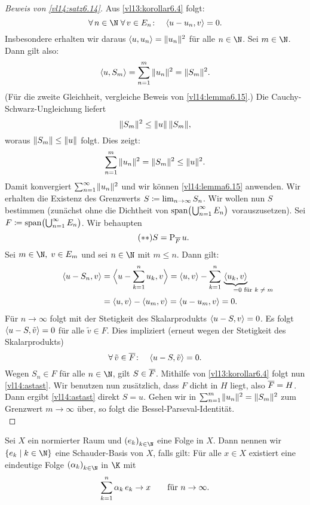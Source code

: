 \begin{proof}[Beweis von \cref{vl14:satz6.14}]
    Aus \cref{vl13:korollar6.4} folgt:
    \[ \forall\,n\in\N\;\forall\, v\in E_n\colon\quad
        \SP{u-u_n, v} = 0
    . \]
    Insbesondere erhalten wir daraus $\SP{u,u_n} = \norm{u_n}^2$ für alle
    $n\in\N$. Sei $m\in\N$. Dann gilt also:
    \[ \SP{u, S_m} = \nsum^m \, \norm{u_n}^2 = \norm{S_m}^2  . \]
    (Für die zweite Gleichheit, vergleiche Beweis von
    \cref{vl14:lemma6.15}.)
    Die Cauchy-Schwarz-Ungleichung  liefert
    \[ \norm{S_m}^2  \leq \norm{u} \, \norm{S_m}  , \]
    woraus $\norm{S_m} \leq \norm{u}$ folgt. Dies zeigt:
    \[ \nsum^m \, \norm{u_n}^2 = \norm{S_m}^2 \leq \norm{u}^2  . \]
    Damit konvergiert $\nsum^\infty \mkern1mu \norm{u_n}^2$ und wir können
    \cref{vl14:lemma6.15} anwenden. Wir erhalten die Existenz des Grenzwerts
    $S \defeq \lim_{n\to\infty} S_n$. Wir wollen nun $S$ bestimmen (zunächst
    ohne die Dichtheit von $\spann\bigl(\mkern1mu\bigcup_{n=1}^\infty E_n\bigr)$
    vorauszusetzen).
    Sei $F \defeq \spann\bigl(\bigcup_{n=1}^\infty E_n\bigr)$. Wir behaupten
    \[ \tag{$\ast\ast$} \label{vl14:astast}
        S = \Proj_{\setclosure F} u 
    . \]
    Sei $m\in\N,\;v\in E_m$ und sei $n\in\N$ mit $m\leq n$. Dann gilt:
    \begin{align*}
        \SP{u-S_n, v} 
        &= \SPa[\Big]{u-\ksum^n u_k, v}
        = \SP{u,v} - \ksum^n \, \underbrace{\SP{u_k,v}}_{
            \;\; =0 \mathrlap{\text{ für $k\neq m$}}}
        \\
        &= \SP{u,v} - \SP{u_m,v} = \SP{u-u_m,v} = 0
    . \end{align*}
    Für $n\to\infty$ folgt mit der Stetigkeit des Skalarprodukts 
    $\SP{u-S,v} = 0$. Es folgt $\SP{u-S,\tilde v}=0$ für alle $\tilde v\in F$.
    Dies impliziert (erneut wegen der Stetigkeit des Skalarprodukts)
    \[ \forall\,\tilde v\in\setclosure{F}\colon\quad \SP{u-S,\tilde v} = 0  . \]
    Wegen $S_n\in F$ für alle $n\in\N$, gilt $S\in\setclosure F$. Mithilfe von
    \eqref{vl13:korollar6.4} folgt nun \eqref{vl14:astast}.
    Wir benutzen nun zusätzlich, dass $F$ dicht in $H$ liegt, also
    $\setclosure{F} = H$. Dann ergibt \eqref{vl14:astast} direkt $S=u$.
    Gehen wir in $\nsum^m \mkern1mu \norm{u_n}^2 = \norm{S_m}^2$ zum Grenzwert
    $m\to\infty$ über, so folgt die Bessel-Parseval-Identität.
    \\
\end{proof}

\begin{thDef}
    Sei $X$ ein normierter Raum und $\kSeq e$ eine Folge in $X$. Dann nennen wir
    $\{ e_k \Mid k\in\N \}$ eine Schauder-Basis von $X$, falls gilt: Für alle
    $x\in X$ existiert eine eindeutige Folge $\kSeq\alpha$ in $\K$ mit
    \[ \ksum^n \alpha_k\,e_k \to x \fuer n\to\infty  . \]
\end{thDef}

